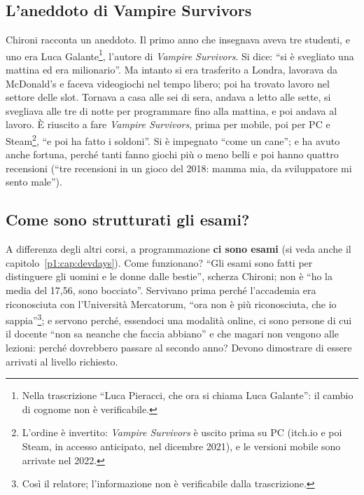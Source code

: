 \subsection{L'aneddoto di Vampire Survivors}

Chironi racconta un aneddoto. Il primo anno che insegnava aveva tre studenti,
e uno era Luca Galante\footnote{Nella trascrizione ``Luca Pieracci, che ora si
chiama Luca Galante'': il cambio di cognome non è verificabile.}, l'autore di
\emph{Vampire Survivors}. Si dice: ``si è svegliato una mattina ed era
milionario''. Ma intanto si era trasferito a Londra, lavorava da McDonald's e
faceva videogiochi nel tempo libero; poi ha trovato lavoro nel settore delle
slot. Tornava a casa alle sei di sera, andava a letto alle sette, si svegliava
alle tre di notte per programmare fino alla mattina, e poi andava al lavoro.
È riuscito a fare \emph{Vampire Survivors}, prima per mobile, poi per PC e
Steam\footnote{L'ordine è invertito: \emph{Vampire Survivors} è uscito prima
su PC (itch.io e poi Steam, in accesso anticipato, nel dicembre 2021), e le
versioni mobile sono arrivate nel 2022.}, ``e poi ha fatto i soldoni''. Si è
impegnato ``come un cane''; e ha avuto anche fortuna, perché tanti fanno
giochi più o meno belli e poi hanno quattro recensioni (``tre recensioni in un
gioco del 2018: mamma mia, da sviluppatore mi sento male'').

\subsection{Come sono strutturati gli esami?}

A differenza degli altri corsi, a programmazione \textbf{ci sono esami}
(si veda anche il capitolo~\ref{p1:cap:devdays}). Come funzionano? ``Gli esami
sono fatti per distinguere gli uomini e le donne dalle bestie'', scherza
Chironi; non è ``ho la media del 17,56, sono bocciato''. Servivano prima perché
l'accademia era riconosciuta con l'Università Mercatorum, ``ora non è più
riconosciuta, che io sappia''\footnote{Così il relatore; l'informazione non è
verificabile dalla trascrizione.}; e servono perché, essendoci una modalità
online, ci sono persone di cui il docente ``non sa neanche che faccia abbiano''
e che magari non vengono alle lezioni: perché dovrebbero passare al secondo
anno? Devono dimostrare di essere arrivati al livello richiesto.

